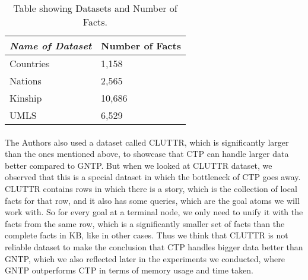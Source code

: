 \documentclass[Other]{iitddiss}
\begin{document}
\begin{table}[H]
	\centering
	\begin{tabular}{|l|l|}
		\hline
		\textit{\textbf{Name of Dataset}} & \textbf{Number of Facts} \\ \hline
		Countries                               & 1,158                  \\ \hline
		Nations                        & 2,565                   \\ \hline
		Kinship                        & 10,686                   \\ \hline
		UMLS                       & 6,529                  \\ \hline
	\end{tabular}
	\caption{Table showing Datasets and Number of Facts.}
\label{tab:my-table}
\end{table}

\paragraph{}
The Authors also used a dataset called CLUTTR, which is significantly larger than the ones mentioned above, to showcase that CTP can handle larger data better compared to GNTP. But when we looked at CLUTTR dataset, we observed that this is a special dataset in which the bottleneck of CTP goes away. CLUTTR contains rows in which there is a story, which is the collection of local facts for that row, and it also has some queries, which are the goal atoms we will work with. So for every goal at a terminal node, we only need to unify it with the facts from the same row, which is a significantly smaller set of facts than the complete facts in KB, like in other cases. Thus we think that CLUTTR is not reliable dataset to make the conclusion that CTP handles bigger data better than GNTP, which we also reflected later in the experiments we conducted, where GNTP outperforms CTP in terms of memory usage and time taken.
\end{document}
